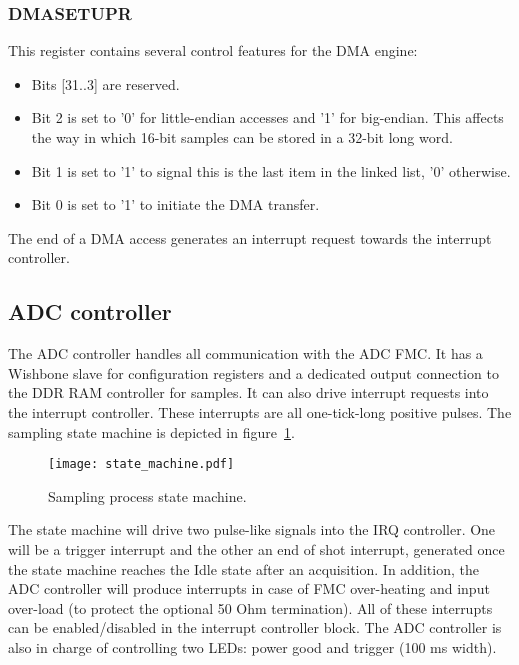 \documentclass{article}
\begin{document}
\subsubsection{DMASETUPR}
This register contains several control features for the DMA engine:
\begin{itemize}
\item Bits [31..3] are reserved.
\item Bit 2 is set to '0' for little-endian accesses and '1' for big-endian. This affects the way in which 16-bit samples can be stored in a 32-bit long word.
\item Bit 1 is set to '1' to signal this is the last item in the linked list, '0' otherwise.
\item Bit 0 is set to '1' to initiate the DMA transfer.
\end{itemize}

The end of a DMA access generates an interrupt request towards the interrupt controller.

\subsection{ADC controller}
The ADC controller handles all communication with the ADC FMC. It has a Wishbone slave for configuration registers and a dedicated output connection to the DDR RAM controller for samples. It can also drive interrupt requests into the interrupt controller. These interrupts are all one-tick-long positive pulses. The sampling state machine is depicted in figure~\ref{fig:state_machine}. 

\begin{figure}[htbp]
  \centering
  \texttt{[image: state\_machine.pdf]}
  \caption{Sampling process state machine.}
  \label{fig:state_machine}
\end{figure}

The state machine will drive two pulse-like signals into the IRQ controller. One will be a trigger interrupt and the other an end of shot interrupt, generated once the state machine reaches the Idle state after an acquisition. In addition, the ADC controller will produce interrupts in case of FMC over-heating and input over-load (to protect the optional 50 Ohm termination). All of these interrupts can be enabled/disabled in the interrupt controller block. The ADC controller is also in charge of controlling two LEDs: power good and trigger (100 ms width).
\end{document}
